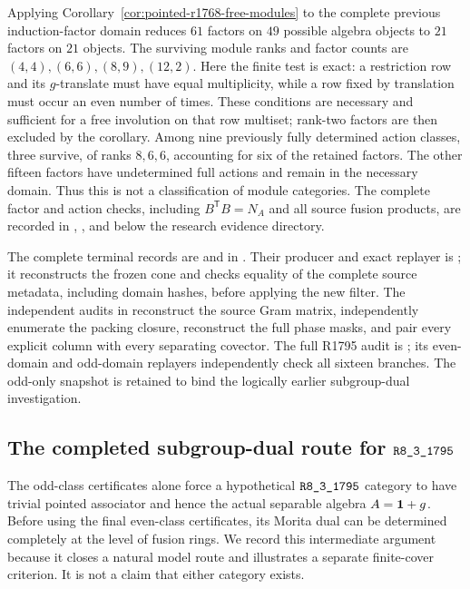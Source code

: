 Applying Corollary~\ref{cor:pointed-r1768-free-modules} to the complete
previous induction-factor domain reduces $61$ factors on $49$ possible
algebra objects to $21$ factors on $21$ objects.  The surviving module
ranks and factor counts are $(4,4),(6,6),(8,9),(12,2)$.  Here the finite
test is exact: a restriction row and its $g$-translate must have equal
multiplicity, while a row fixed by translation must occur an even number
of times.  These conditions are necessary and sufficient for a free
involution on that row multiset; rank-two factors are then excluded by
the corollary.  Among nine previously fully determined action classes,
three survive, of ranks $8,6,6$, accounting for six of the retained
factors.  The other fifteen factors have undetermined full actions and
remain in the necessary domain.  Thus this is not a classification of
module categories.  The complete factor and action checks, including
$B^{\mathsf T}B=N_A$ and all source fusion products, are recorded in
, , and
 below the research evidence directory.

The complete terminal records are  and
 in
.
Their producer and exact replayer is ; it reconstructs
the frozen cone and checks equality of the complete source metadata,
including domain hashes, before applying the new filter.  The independent
audits in 
reconstruct the source Gram matrix, independently enumerate the packing
closure, reconstruct the full phase masks, and pair every explicit
column with every separating covector.  The full R1795 audit is
; its even-domain and
odd-domain replayers independently check all sixteen branches.
The odd-only snapshot
 is retained to bind
the logically earlier subgroup-dual investigation.

\subsection{The completed subgroup-dual route for $\sha{R8_3_1795}$}
\label{subsec:pointed-r1795-morita}

The odd-class certificates alone force a hypothetical
$\sha{R8_3_1795}$ category to have trivial pointed associator and hence
the actual separable algebra $A=\mathbf1+g$.  Before using the final
even-class certificates, its Morita dual can be determined completely
at the level of fusion rings.  We record this intermediate argument
because it closes a natural model route and illustrates a separate
finite-cover criterion.  It is not a claim that either category exists.

